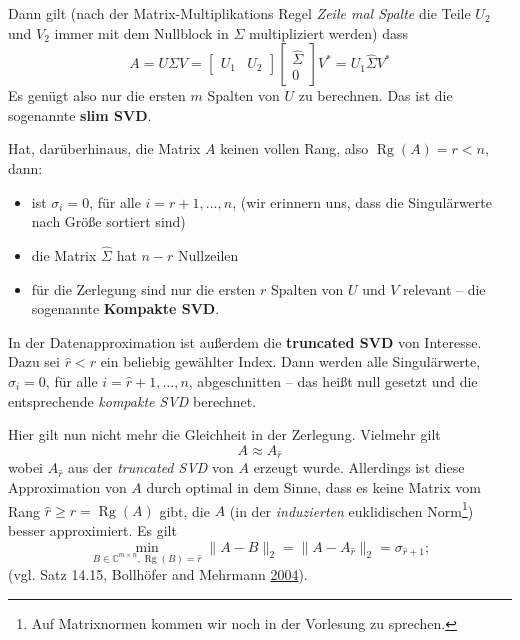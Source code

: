\documentclass[]{book}
\providecommand{\tightlist}{%
  \setlength{\itemsep}{0pt}\setlength{\parskip}{0pt}}
\theoremstyle{definition}
\theoremstyle{definition}
\theoremstyle{definition}
\theoremstyle{definition}
\theoremstyle{remark}
\begin{document}
Dann gilt (nach der Matrix-Multiplikations Regel \emph{Zeile mal Spalte} die Teile \(U_2\) und \(V_2\) immer mit dem Nullblock in \(\Sigma\) multipliziert werden) dass
\begin{equation*}
A = U\Sigma V = 
\begin{bmatrix}
U_1 & U_2
\end{bmatrix}
\begin{bmatrix}
\hat \Sigma \\ 0
\end{bmatrix}
V^*
=
U_1 
\hat \Sigma
V^*
\end{equation*}
Es genügt also nur die ersten \(m\) Spalten von \(U\) zu berechnen. Das ist die sogenannte \textbf{slim SVD}.

Hat, darüberhinaus, die Matrix \(A\) keinen vollen Rang, also \(\operatorname{Rg}(A) = r < n\), dann:

\begin{itemize}
\tightlist
\item
  ist \(\sigma_i=0\), für alle \(i=r+1, \dotsc, n\), (wir erinnern uns, dass die Singulärwerte nach Größe sortiert sind)
\item
  die Matrix \(\hat \Sigma\) hat \(n-r\) Nullzeilen
\item
  für die Zerlegung sind nur die ersten \(r\) Spalten von \(U\) und \(V\) relevant -- die sogenannte \textbf{Kompakte SVD}.
\end{itemize}

In der Datenapproximation ist außerdem die \textbf{truncated SVD} von Interesse. Dazu sei \(\hat r<r\) ein beliebig gewählter Index. Dann werden alle Singulärwerte, \(\sigma_i=0\), für alle \(i=\hat r+1, \dotsc, n\), abgeschnitten -- das heißt null gesetzt und die entsprechende \emph{kompakte SVD} berechnet.

Hier gilt nun nicht mehr die Gleichheit in der Zerlegung. Vielmehr gilt
\begin{equation*}
A \approx A_{\hat r}
\end{equation*}
wobei \(A_{\hat r}\) aus der \emph{truncated SVD} von \(A\) erzeugt wurde. Allerdings ist diese Approximation von \(A\) durch optimal in dem Sinne, dass es keine Matrix vom Rang \(\hat r \geq r=\operatorname{Rg}(A)\) gibt, die \(A\) (in der \emph{induzierten} euklidischen Norm\footnote{Auf Matrixnormen kommen wir noch in der Vorlesung zu sprechen.}) besser approximiert. Es gilt
\begin{equation*}
\min_{B\in \mathbb C^{m\times n}, \operatorname{Rg}(B)=\hat r} \|A-B\|_2 = \|A-A_{\hat r}\|_2 = \sigma_{\hat r + 1};
\end{equation*}
(vgl. Satz 14.15, Bollhöfer and Mehrmann \protect\hyperlink{ref-BolM04}{2004}).
\end{document}
